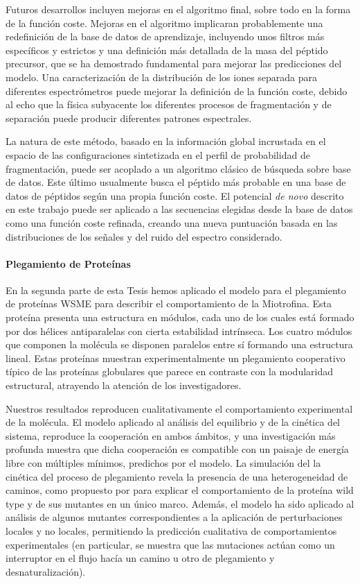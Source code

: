 Futuros desarrollos incluyen mejoras en el algoritmo final, sobre todo en
la forma de la función coste.
Mejoras en el algoritmo implicaran probablemente una redefinición de la
base de datos de aprendizaje, incluyendo unos filtros más específicos y estrictos y una
definición más detallada de la masa del péptido precursor, que se ha
demostrado fundamental para mejorar las predicciones del modelo.
Una caracterización de la distribución de los iones separada para diferentes
espectrómetros puede mejorar la definición de la función coste, debido
al echo que la física subyacente los diferentes procesos de fragmentación y
de separación puede producir diferentes patrones espectrales.

La natura de este método, basado en la información global incrustada en el espacio de las
configuraciones sintetizada en el perfil de probabilidad de fragmentación, puede ser acoplado a un
algoritmo clásico de búsqueda sobre base de datos.
Este último usualmente busca el péptido más probable en una base de datos de péptidos
según una propia función coste. El potencial \emph{de novo} descrito en este trabajo puede ser
aplicado a las secuencias elegidas desde la base de datos como una función coste
refinada, creando una nueva puntuación basada en las distribuciones de los señales
y del ruido del espectro considerado.

\paragraph{Plegamiento de Proteínas}

En la segunda parte de esta Tesis hemos aplicado el modelo para el plegamiento
de proteínas WSME para describir el comportamiento de la Miotrofina.
Esta proteína presenta una estructura en módulos, cada uno de los cuales está formado
por dos hélices antiparalelas con cierta estabilidad intrínseca. 
Los  cuatro módulos que componen la molécula se disponen paralelos entre sí formando una estructura lineal.
Estas proteínas muestran experimentalmente un plegamiento cooperativo típico de
las proteínas globulares que parece 
en contraste con la modularidad estructural, atrayendo la atención
de los investigadores. 

Nuestros resultados reproducen cualitativamente el comportamiento experimental
de la molécula.
El modelo aplicado al análisis del equilibrio y de la cinética del sistema,
reproduce la cooperación en ambos ámbitos, y una investigación más profunda 
muestra que dicha cooperación es compatible con un
paisaje de energía libre con múltiples mínimos, predichos por el modelo.
La simulación del la cinética del proceso de plegamiento revela la presencia de
una heterogeneidad de caminos, como propuesto por \citet{Lowe2007a} para
explicar el comportamiento de la proteína wild type y de sus
mutantes en un único marco.
Además, el modelo ha sido aplicado al análisis de algunos mutantes
correspondientes a la aplicación de perturbaciones locales y no locales, permitiendo
la predicción cualitativa de comportamientos experimentales (en particular, se
muestra que las mutaciones actúan como un interruptor en el flujo 
hacía un camino u otro de plegamiento y desnaturalización).

